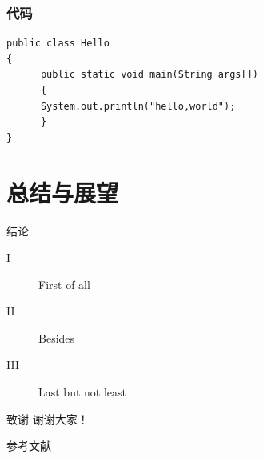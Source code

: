 \documentclass[hyperref,UTF8,11pt]{beamer}
\numberwithin{equation}{section} %
\begin{document}
\begin{frame}[fragile]
\frametitle{代码}
\begin{verbatim}
public class Hello
{
      public static void main(String args[])
      {
      System.out.println("hello,world");
      }
}
\end{verbatim}
\end{frame}

\section{总结与展望}

\begin{frame}{结论}
    \begin{description}
        \item[I] First of all
        \item[II] Besides
        \item[III] Last but not least
    \end{description}
\end{frame}

\begin{frame}{致谢}
 \centering
 \Huge 谢谢大家！
\end{frame}

\begin{frame}{参考文献}


\end{frame}
\end{document}
